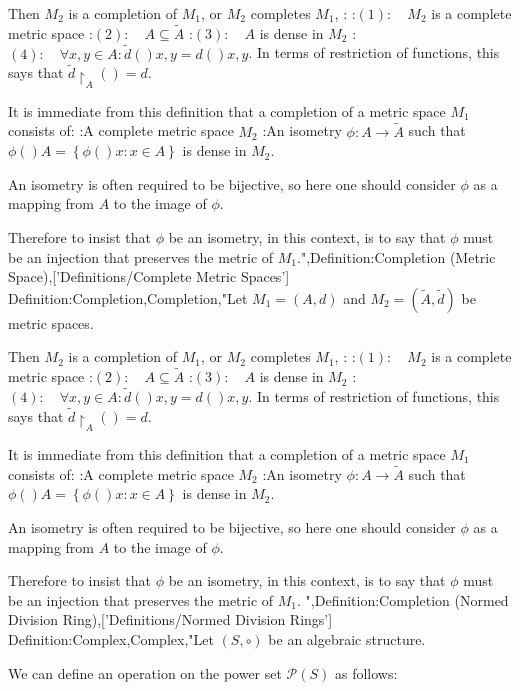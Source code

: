 Then $M_2$ is a completion of $M_1$, or $M_2$ completes $M_1$, :
:$(1): \quad M_2$ is a complete metric space
:$(2): \quad A \subseteq \tilde A$
:$(3): \quad A$ is dense in $M_2$
:$(4): \quad \forall x, y \in A : \tilde d \left(   \right){x, y} = d \left(   \right){x, y}$. In terms of restriction of functions, this says that $\tilde d {\restriction_A}  \left(   \right)= d$.


It is immediate from this definition that a completion of a metric space $M_1$ consists of:
:A complete metric space $M_2$
:An isometry $\phi : A \to \tilde A$
such that $\phi \left(   \right)A = \left\lbrace \phi \left(   \right)x: x \in A \right\rbrace$ is dense in $M_2$.

An isometry is often required to be bijective, so here one should consider $\phi$ as a mapping from $A$ to the image of $\phi$.

Therefore to insist that $\phi$ be an isometry, in this context, is to say that $\phi$ must be an injection that preserves the metric of $M_1$.",Definition:Completion (Metric Space),['Definitions/Complete Metric Spaces']
Definition:Completion,Completion,"Let $M_1 = \left( A, d \right)$ and $M_2 = \left( \tilde A, \tilde d \right)$ be metric spaces.

Then $M_2$ is a completion of $M_1$, or $M_2$ completes $M_1$, :
:$(1): \quad M_2$ is a complete metric space
:$(2): \quad A \subseteq \tilde A$
:$(3): \quad A$ is dense in $M_2$
:$(4): \quad \forall x, y \in A : \tilde d \left(   \right){x, y} = d \left(   \right){x, y}$. In terms of restriction of functions, this says that $\tilde d {\restriction_A}  \left(   \right)= d$.


It is immediate from this definition that a completion of a metric space $M_1$ consists of:
:A complete metric space $M_2$
:An isometry $\phi : A \to \tilde A$
such that $\phi \left(   \right)A = \left\lbrace \phi \left(   \right)x: x \in A \right\rbrace$ is dense in $M_2$.

An isometry is often required to be bijective, so here one should consider $\phi$ as a mapping from $A$ to the image of $\phi$.

Therefore to insist that $\phi$ be an isometry, in this context, is to say that $\phi$ must be an injection that preserves the metric of $M_1$.
",Definition:Completion (Normed Division Ring),['Definitions/Normed Division Rings']
Definition:Complex,Complex,"Let $\left( S, \circ \right)$ be an algebraic structure.


We can define an operation on the power set $\mathcal P \left( S \right)$ as follows:

